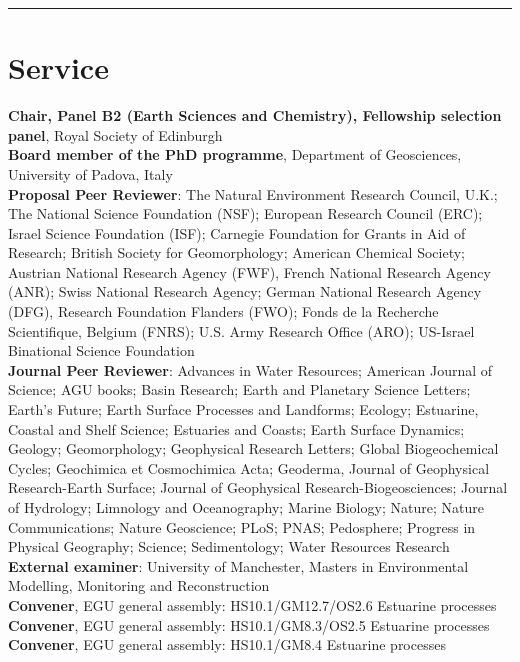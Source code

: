 \documentclass[10pt, a4paper]{article}
\newcommand{\years}[1]{\marginnote{\scriptsize #1}}
\begin{document}
\hrule
\section*{Service}
\years{2022--}\textbf{Chair, Panel B2 (Earth Sciences and Chemistry), Fellowship selection panel}, Royal Society of Edinburgh\\[0.05cm]
\years{2017--}\textbf{Board member of the PhD programme}, Department of Geosciences, University of Padova, Italy\\[0.05cm]
\years{2006--}\textbf{Proposal Peer Reviewer}: The Natural Environment Research Council, U.K.; The National Science Foundation (NSF); European Research Council (ERC); Israel Science Foundation (ISF); Carnegie Foundation for Grants in Aid of Research; British Society for Geomorphology; American Chemical Society; Austrian National Research Agency (FWF), French National Research Agency (ANR); Swiss National Research Agency; German National Research Agency (DFG), Research Foundation Flanders (FWO); Fonds de la Recherche Scientifique, Belgium (FNRS); U.S. Army Research Office (ARO); US-Israel Binational Science Foundation\\[0.05cm]
\years{2004--}\textbf{Journal Peer Reviewer}: Advances in Water Resources; American Journal of Science; AGU books; Basin Research; Earth and Planetary Science Letters; Earth's Future; Earth Surface Processes and Landforms; Ecology; Estuarine, Coastal and Shelf Science; Estuaries and Coasts; Earth Surface Dynamics; Geology; Geomorphology; Geophysical Research Letters; Global Biogeochemical Cycles; Geochimica et Cosmochimica Acta; Geoderma, Journal of Geophysical Research-Earth Surface; Journal of Geophysical Research-Biogeosciences; Journal of Hydrology; Limnology and Oceanography; Marine Biology; Nature; Nature Communications; Nature Geoscience; PLoS; PNAS; Pedosphere; Progress in Physical Geography; Science; Sedimentology; Water Resources Research\\[0.05cm]
\years{2014--2017}\textbf{External examiner}: University of Manchester, Masters in Environmental Modelling, Monitoring and Reconstruction\\[0.05cm]\years{2016}\textbf{Convener}, EGU general assembly: HS10.1/GM12.7/OS2.6 Estuarine processes\\[0.05cm]
\years{2015}\textbf{Convener}, EGU general assembly: HS10.1/GM8.3/OS2.5 Estuarine processes\\[0.05cm]
\years{2014}\textbf{Convener}, EGU general assembly: HS10.1/GM8.4 Estuarine processes\\[0.05cm]
\end{document}
